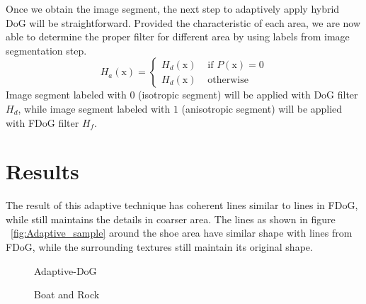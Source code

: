 Once we obtain the image segment, the next step to adaptively apply hybrid DoG will be straightforward. Provided the characteristic of each area, we are now able to determine the proper filter for different area by using labels from image segmentation step. 
\begin{equation}
	H_{a}(\mbox{x})=
		\left\{
			\begin{array}{ll}
				H_{d}(\mbox{x})&\mbox{ if }P(\mbox{x}) = 0
				\\
				H_{d}(\mbox{x})&\mbox{ otherwise }
			\end{array}
		\right.
\end{equation}
Image segment labeled with $0$ (isotropic segment) will be applied with DoG filter $H_{d}$, while image segment labeled with $1$ (anisotropic segment) will be applied with FDoG filter $H_{f}$. 

\section{Results}
The result of this adaptive technique has coherent lines similar to lines in FDoG, while still maintains the details in coarser area. The lines as shown in figure ~\ref{fig:Adaptive_sample} around the shoe area have similar shape with lines from FDoG, while the surrounding textures still maintain its original shape.

\begin{figure}[H]
	\centering
	\caption{Adaptive-DoG}\label{fig:Adaptive_DoG}
\end{figure}

\begin{figure}[H]
	\centering
	\caption{Boat and Rock}\label{fig:Compare1}
\end{figure}

